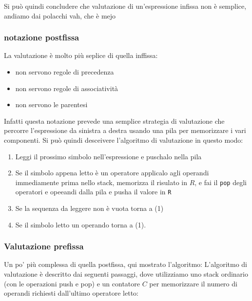 Si può quindi concludere che valutazione di un’espressione infissa non è semplice, andiamo dai polacchi vah, che è mejo

\subsubsection{notazione postfissa}
La valutazione è molto più seplice di quella inffissa:
\begin{itemize}
    \item non servono regole di precedenza
    \item non servono regole di associatività
    \item non servono le parentesi
\end{itemize}

Infatti questa notazione prevede una semplice strategia di valutazione che percorre l'espressione da sinistra a destra usando una pila per memorizzare i vari componenti. Si può quindi desceivere l'algoritmo di valutazione in questo modo:

\begin{enumerate}
    \item Leggi il prossimo simbolo nell'espressione e puschalo nella pila
    \item Se il simbolo appena letto è un operatore applicalo agli operandi immediamente prima nello stack, memorizza il risulato in $R$, e fai il \texttt{pop} degli operatori e opeeandi dalla pila e pusha il valore in \texttt{R}
    \item Se la sequenza da leggere non è vuota torna a (1) 
    
    \item Se il simbolo letto un operando torna a (1).
\end{enumerate}

\subsubsection{Valutazione prefissa}
Un po' più complessa di quella postfissa, qui mostrato l'algoritmo:
L'algoritmo di valutazione è descritto dai seguenti passaggi, dove utilizziamo uno stack ordinario (con le operazioni push e pop) e un contatore $C$ per memorizzare il numero di operandi richiesti dall'ultimo operatore letto:

